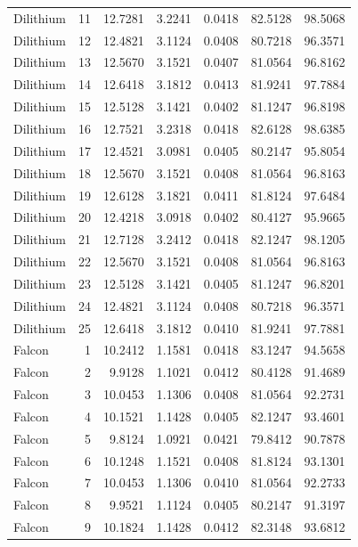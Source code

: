 \documentclass[11pt,a4paper]{article}
\begin{document}
{\begin{longtable}{l r r r r r r}
Dilithium & 11 &   12.7281 & 3.2241 & 0.0418 & 82.5128 &    98.5068 \\
Dilithium & 12 &   12.4821 & 3.1124 & 0.0408 & 80.7218 &    96.3571 \\
Dilithium & 13 &   12.5670 & 3.1521 & 0.0407 & 81.0564 &    96.8162 \\
Dilithium & 14 &   12.6418 & 3.1812 & 0.0413 & 81.9241 &    97.7884 \\
Dilithium & 15 &   12.5128 & 3.1421 & 0.0402 & 81.1247 &    96.8198 \\
Dilithium & 16 &   12.7521 & 3.2318 & 0.0418 & 82.6128 &    98.6385 \\
Dilithium & 17 &   12.4521 & 3.0981 & 0.0405 & 80.2147 &    95.8054 \\
Dilithium & 18 &   12.5670 & 3.1521 & 0.0408 & 81.0564 &    96.8163 \\
Dilithium & 19 &   12.6128 & 3.1821 & 0.0411 & 81.8124 &    97.6484 \\
Dilithium & 20 &   12.4218 & 3.0918 & 0.0402 & 80.4127 &    95.9665 \\
Dilithium & 21 &   12.7128 & 3.2412 & 0.0418 & 82.1247 &    98.1205 \\
Dilithium & 22 &   12.5670 & 3.1521 & 0.0408 & 81.0564 &    96.8163 \\
Dilithium & 23 &   12.5128 & 3.1421 & 0.0405 & 81.1247 &    96.8201 \\
Dilithium & 24 &   12.4821 & 3.1124 & 0.0408 & 80.7218 &    96.3571 \\
Dilithium & 25 &   12.6418 & 3.1812 & 0.0410 & 81.9241 &    97.7881 \\
\midrule
Falcon    &  1 &   10.2412 & 1.1581 & 0.0418 & 83.1247 &    94.5658 \\
Falcon    &  2 &    9.9128 & 1.1021 & 0.0412 & 80.4128 &    91.4689 \\
Falcon    &  3 &   10.0453 & 1.1306 & 0.0408 & 81.0564 &    92.2731 \\
Falcon    &  4 &   10.1521 & 1.1428 & 0.0405 & 82.1247 &    93.4601 \\
Falcon    &  5 &    9.8124 & 1.0921 & 0.0421 & 79.8412 &    90.7878 \\
Falcon    &  6 &   10.1248 & 1.1521 & 0.0408 & 81.8124 &    93.1301 \\
Falcon    &  7 &   10.0453 & 1.1306 & 0.0410 & 81.0564 &    92.2733 \\
Falcon    &  8 &    9.9521 & 1.1124 & 0.0405 & 80.2147 &    91.3197 \\
Falcon    &  9 &   10.1824 & 1.1428 & 0.0412 & 82.3148 &    93.6812 \\

\end{longtable}}
\end{document}

